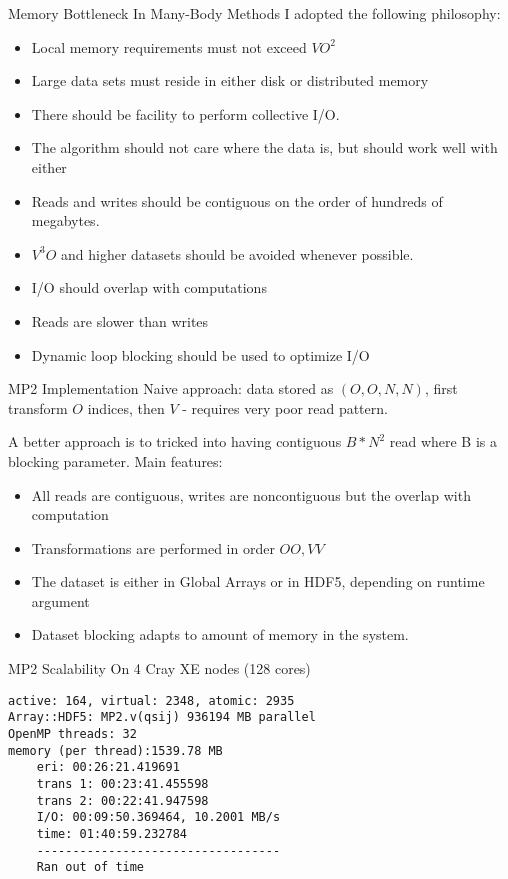 \documentclass{beamer}
\begin{document}
\begin{frame}{Memory Bottleneck In Many-Body Methods}
  I adopted the following philosophy:
\begin{itemize}
\item Local memory requirements must not exceed $VO^2$
\item Large data sets must reside in either disk or distributed memory
\item There should be facility to perform collective I/O.
\item The algorithm should not care where the data is, but should work
 well with either
\item Reads and writes should be contiguous on the order of hundreds
  of megabytes.
\item $V^3O$ and higher datasets should be avoided whenever possible.
\item I/O should overlap with computations
\item Reads are slower than writes
\item Dynamic loop blocking should be used to optimize I/O
\end {itemize}
\end{frame}


\begin{frame}[fragile]{MP2 Implementation}
Naive approach:  data stored as $(O,O,N,N)$, first transform $O$
indices, then $V$ - requires very poor read pattern.

A better approach is to tricked into having contiguous $B*N^2$ read where B
is a blocking parameter.  Main features:
\begin{itemize}
\item All reads are contiguous, writes are noncontiguous but the
  overlap with computation
\item Transformations are performed in order $OO,VV$
\item The dataset is either in Global Arrays or in HDF5, depending on
  runtime argument
\item Dataset blocking adapts to amount of memory in the system.
\end {itemize}
\end{frame}

\begin{frame}[fragile]{MP2 Scalability}
On 4 Cray XE nodes (128 cores)
\begin{verbatim}
active: 164, virtual: 2348, atomic: 2935
Array::HDF5: MP2.v(qsij) 936194 MB parallel
OpenMP threads: 32
memory (per thread):1539.78 MB
    eri: 00:26:21.419691
    trans 1: 00:23:41.455598
    trans 2: 00:22:41.947598
    I/O: 00:09:50.369464, 10.2001 MB/s
    time: 01:40:59.232784
    ---------------------------------- 
    Ran out of time
\end{verbatim}
\end{frame}
\end{document}
